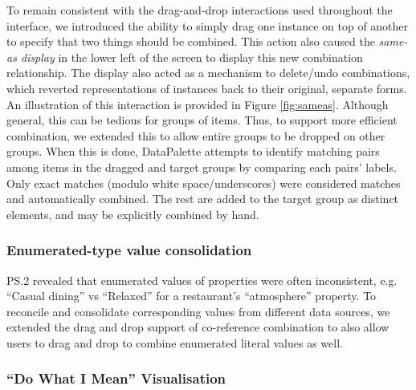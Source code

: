 \documentclass{sigchi}
\begin{document}
To remain consistent with the drag-and-drop interactions used throughout the interface, we introduced the ability to simply drag one instance on top of another to specify that two things should be combined.  This action also caused the \emph{same-as display} in the lower left of the screen to display this new combination relationship.  The display also acted as a mechanism to delete/undo combinations, which reverted representations of instances back to their original, separate forms. An illustration of this interaction is provided in Figure \ref{fig:sameas}. Although general, this can be tedious for groups of items.  Thus, to support more efficient combination, we extended this to allow entire groups to be dropped on other groups.  When this is done, DataPalette attempts to identify matching pairs among items in the dragged and target groups by comparing each pairs' labels.  Only exact matches (modulo white space/underscores) were considered matches and automatically combined.  The rest are added to the target group as distinct elements, and may be explicitly combined by hand.


\subsubsection{Enumerated-type value consolidation}
PS.2 revealed that enumerated values of properties were often inconsistent, e.g. ``Casual dining'' vs ``Relaxed'' for a restaurant's ``atmosphere'' property. To reconcile and consolidate corresponding values from different  data sources, we extended the drag and drop support of co-reference combination to also allow users to drag and drop to combine enumerated literal values as well.  

\subsubsection{``Do What I Mean'' Visualisation}
\end{document}
